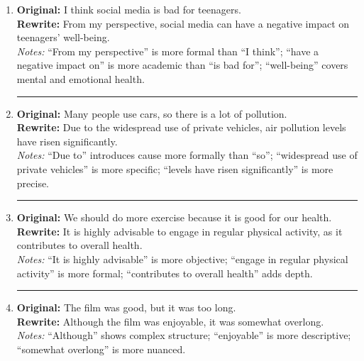 \begin{enumerate}[leftmargin=2em, label=\arabic*.]

    \item \textbf{Original:} I think social media is bad for teenagers. \\
    \textbf{Rewrite:} From my perspective, social media can have a negative impact on teenagers’ well-being. \\
    \textit{Notes:} “From my perspective” is more formal than “I think”; “have a negative impact on” is more academic than “is bad for”; “well-being” covers mental and emotional health.

    \vspace{2ex}
    \hrule
    \vspace{2ex}

    \item \textbf{Original:} Many people use cars, so there is a lot of pollution. \\
    \textbf{Rewrite:} Due to the widespread use of private vehicles, air pollution levels have risen significantly. \\
    \textit{Notes:} “Due to” introduces cause more formally than “so”; “widespread use of private vehicles” is more specific; “levels have risen significantly” is more precise.

    \vspace{2ex}
    \hrule
    \vspace{2ex}

    \item \textbf{Original:} We should do more exercise because it is good for our health. \\
    \textbf{Rewrite:} It is highly advisable to engage in regular physical activity, as it contributes to overall health. \\
    \textit{Notes:} “It is highly advisable” is more objective; “engage in regular physical activity” is more formal; “contributes to overall health” adds depth.

    \vspace{2ex}
    \hrule
    \vspace{2ex}

    \item \textbf{Original:} The film was good, but it was too long. \\
    \textbf{Rewrite:} Although the film was enjoyable, it was somewhat overlong. \\
    \textit{Notes:} “Although” shows complex structure; “enjoyable” is more descriptive; “somewhat overlong” is more nuanced.


\end{enumerate}
